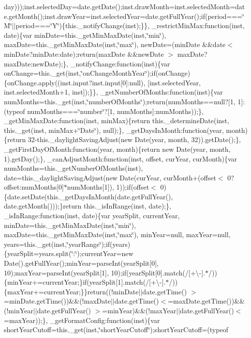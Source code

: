 {{\begin{DoxyParamCaption}
day)));inst.\+selected\+Day=date.\+get\+Date();inst.\+draw\+Month=inst.\+selected\+Month=date.\+get\+Month();inst.\+draw\+Year=inst.\+selected\+Year=date.\+get\+Full\+Year();if(period===\char`\"{}\+M\char`\"{}$\vert$$\vert$period===\char`\"{}\+Y\char`\"{})\{this.\+\_\+notify\+Change(inst);\}\}, \+\_\+restrict\+Min\+Max\+:function(inst, date)\{var min\+Date=this.\+\_\+get\+Min\+Max\+Date(inst,\char`\"{}min\char`\"{}), max\+Date=this.\+\_\+get\+Min\+Max\+Date(inst,\char`\"{}max\char`\"{}), new\+Date=(min\+Date \&\&date$<$ min\+Date?min\+Date\+:date);return(max\+Date \&\&new\+Date $>$ max\+Date?max\+Date\+:new\+Date);\}, \+\_\+notify\+Change\+:function(inst)\{var on\+Change=this.\+\_\+get(inst,\char`\"{}on\+Change\+Month\+Year\char`\"{});if(on\+Change)\{on\+Change.\+apply((inst.\+input?inst.\+input\mbox{[}0\mbox{]}\+:null), \mbox{[}inst.\+selected\+Year, inst.\+selected\+Month+1, inst\mbox{]});\}\}, \+\_\+get\+Number\+Of\+Months\+:function(inst)\{var num\+Months=this.\+\_\+get(inst,\char`\"{}number\+Of\+Months\char`\"{});return(num\+Months==null?\mbox{[}1, 1\mbox{]}\+:(typeof num\+Months===\char`\"{}number\char`\"{}?\mbox{[}1, num\+Months\mbox{]}\+:num\+Months));\}, \+\_\+get\+Min\+Max\+Date\+:function(inst, min\+Max)\{return this.\+\_\+determine\+Date(inst, this.\+\_\+get(inst, min\+Max+\char`\"{}\+Date\char`\"{}), null);\}, \+\_\+get\+Days\+In\+Month\+:function(year, month)\{return 32-\/this.\+\_\+daylight\+Saving\+Adjust(new Date(year, month, 32)).\+get\+Date();\}, \+\_\+get\+First\+Day\+Of\+Month\+:function(year, month)\{return new Date(year, month, 1).\+get\+Day();\}, \+\_\+can\+Adjust\+Month\+:function(inst, offset, cur\+Year, cur\+Month)\{var num\+Months=this.\+\_\+get\+Number\+Of\+Months(inst), date=this.\+\_\+daylight\+Saving\+Adjust(new Date(cur\+Year, cur\+Month+(offset$<$ 0?offset\+:num\+Months\mbox{[}0\mbox{]}$\ast$num\+Months\mbox{[}1\mbox{]}), 1));if(offset$<$ 0)\{date.\+set\+Date(this.\+\_\+get\+Days\+In\+Month(date.\+get\+Full\+Year(), date.\+get\+Month()));\}return this.\+\_\+is\+In\+Range(inst, date);\}, \+\_\+is\+In\+Range\+:function(inst, date)\{var year\+Split, current\+Year, min\+Date=this.\+\_\+get\+Min\+Max\+Date(inst,\char`\"{}min\char`\"{}), max\+Date=this.\+\_\+get\+Min\+Max\+Date(inst,\char`\"{}max\char`\"{}), min\+Year=null, max\+Year=null, years=this.\+\_\+get(inst,\char`\"{}year\+Range\char`\"{});if(years)\{year\+Split=years.\+split(\char`\"{}\+:\char`\"{});current\+Year=new Date().\+get\+Full\+Year();min\+Year=parse\+Int(year\+Split\mbox{[}0\mbox{]}, 10);max\+Year=parse\+Int(year\+Split\mbox{[}1\mbox{]}, 10);if(year\+Split\mbox{[}0\mbox{]}.\+match(/\mbox{[}+\textbackslash{}-\/\mbox{]}.$\ast$/))\{min\+Year+=current\+Year;\}if(year\+Split\mbox{[}1\mbox{]}.\+match(/\mbox{[}+\textbackslash{}-\/\mbox{]}.$\ast$/))\{max\+Year+=current\+Year;\}\}return((!min\+Date$\vert$$\vert$date.\+get\+Time() $>$=min\+Date.\+get\+Time())\&\&(!max\+Date$\vert$$\vert$date.\+get\+Time()$<$=max\+Date.\+get\+Time())\&\&(!min\+Year$\vert$$\vert$date.\+get\+Full\+Year() $>$=min\+Year)\&\&(!max\+Year$\vert$$\vert$date.\+get\+Full\+Year()$<$=max\+Year));\}, \+\_\+get\+Format\+Config\+:function(inst)\{var short\+Year\+Cutoff=this.\+\_\+get(inst,\char`\"{}short\+Year\+Cutoff\char`\"{});short\+Year\+Cutoff=(typeof 
\end{DoxyParamCaption}}}
